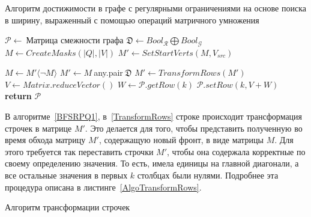 \begin{algorithm}[t]
  \caption{Алгоритм достижимости в графе с регулярными ограничениями на основе поиска в ширину, выраженный с помощью операций матричного умножения}\label{BFSRPQ1}
  \begin{algorithmic}[1]
    \State $\mathcal{P}\gets~${Матрица смежности графа}
    \State $\mathfrak{D}\gets Bool_\mathcal{R} \bigoplus Bool_\mathcal{G}$
    \State $M\gets CreateMasks(|Q|,|V|)$ 
    \State $M'\gets SetStartVerts(M, V_{src})$  
    
      \State $M\gets M'\langle\neg M\rangle$
        \State $M'\gets M~$any.pair$~\mathfrak{D}$
        \State $M'\gets TransformRows(M')$\label{TransformRows}
      \EndFor
        \State $V\gets Matrix.reduceVector()$ 
            \State $W\gets\mathcal{P}.getRow(k)$
            \State $\mathcal{P}.setRow(k, V+W)$
      \EndFor
    \EndWhile
    \State \textbf{return} $\mathcal{P}$
    \EndProcedure
  \end{algorithmic}
\end{algorithm}

В алгоритме~\ref{BFSRPQ1}, в~\ref{TransformRows} строке происходит трансформация строчек в матрице $M'$. Это делается для того, чтобы представить полученную во время обхода матрицу $M'$, содержащую новый фронт, в виде матрицы $M$. Для этого требуется так переставить строчки $M'$, чтобы она содержала корректные по своему определению значения. То есть, имела единицы на главной диагонали, а все остальные значения в первых $k$ столбцах были нулями. Подробнее эта процедура описана в листинге~\ref{AlgoTransformRows}.

\begin{algorithm}[H]
  \caption{Алгоритм трансформации строчек}\label{AlgoTransformRows}
  \begin{algorithmic}[1]
        \EndFor
    \EndProcedure
  \end{algorithmic}
\end{algorithm}

